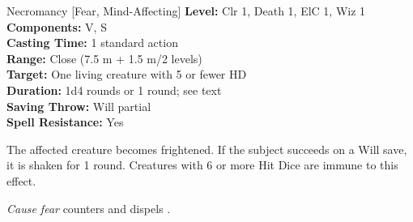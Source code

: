 {Necromancy [Fear, Mind-Affecting]}
{
	\textbf{Level:}
	Clr 1, Death 1, ElC 1, Wiz 1\\
	\textbf{Components:}
	V, S\\
	\textbf{Casting Time:}
	1 standard action\\
	\textbf{Range:}
	Close (7.5 m + 1.5 m/2 levels)\\
	\textbf{Target:}
	One living creature with 5 or fewer HD\\
	\textbf{Duration:}
	1d4 rounds or 1 round; see text\\
	\textbf{Saving Throw:}
	Will partial\\
	\textbf{Spell Resistance:}
	Yes\\
}
{
	The affected creature becomes frightened. If the subject succeeds on a Will save, it is shaken for 1 round. Creatures with 6 or more Hit Dice are immune to this effect.

	\emph{Cause fear} counters and dispels .

}
